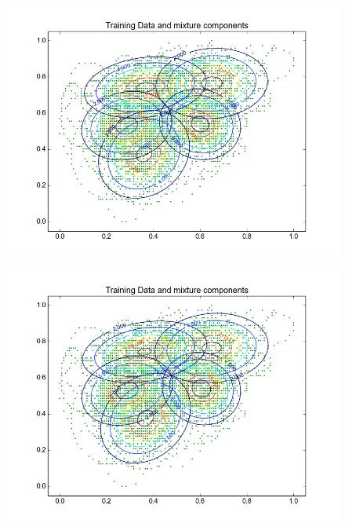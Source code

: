 \documentclass[11pt,a4paper]{article}
\begin{document}
\begin{minipage}[b]{0.25\textwidth}
\begin{figure}[H]
  \centering
  \includegraphics[width=.8\linewidth]{Figures/contours_lA.test10.png}

  \label{fig:sfig1}
\end{figure}%
\end{minipage}
\begin{minipage}[b]{0.25\textwidth}
\begin{figure}[H]
  \centering
  \includegraphics[width=.8\linewidth]{Figures/contours_lA.test15.png}

  \label{fig:sfig1}
\end{figure}%
\end{minipage}
\end{document}

